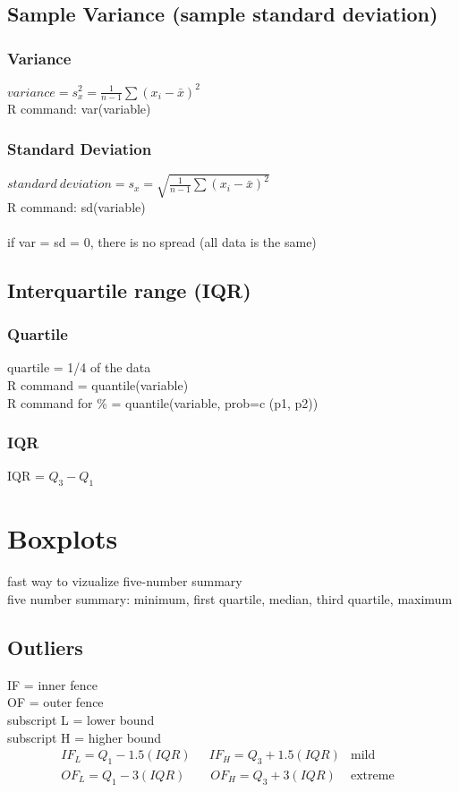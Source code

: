 \subsection{Sample Variance (sample standard deviation)}
\subsubsection{Variance}
$variance=s^2_x=\frac{1}{n-1}\sum(x_i-\bar{x})^2$\\
R command: var(variable)

\subsubsection{Standard Deviation}
$standard\ deviation=s_x=\sqrt{\frac{1}{n-1}\sum(x_i-\bar{x})^2}$\\
R command: sd(variable)\\\\
if var = sd = 0, there is no spread (all data is the same)

\subsection{Interquartile range (IQR)}
\subsubsection{Quartile}
quartile = 1/4 of the data\\
R command = quantile(variable)\\
R command for \% = quantile(variable, prob=c (p1, p2))

\subsubsection{IQR}
IQR = $Q_3-Q_1$\\

\section{Boxplots}
fast way to vizualize five-number summary\\
five number summary: minimum, first quartile, median, third quartile, maximum

\subsection{Outliers}
IF = inner fence\\
OF = outer fence\\
subscript L = lower bound\\
subscript H = higher bound
\begin{align}
     & IF_L=Q_1-1.5(IQR) \quad\ \ IF_H=Q_3+1.5(IQR) & \text{mild}    &  & \\
     & OF_L=Q_1-3(IQR) \qquad OF_H=Q_3+3(IQR)       & \text{extreme}
\end{align}

